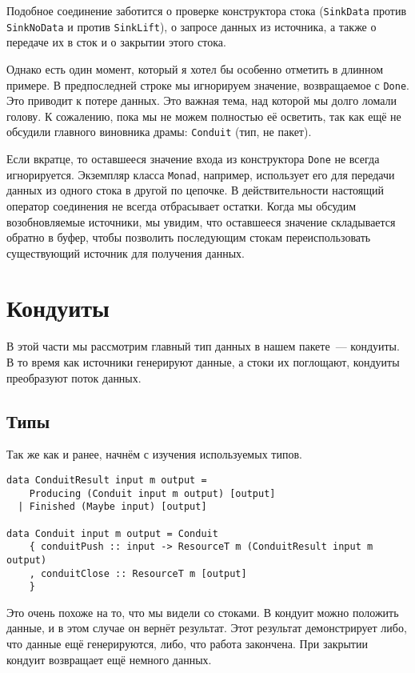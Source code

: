 Подобное соединение заботится о проверке конструктора стока (\lstinline'SinkData' против
\lstinline'SinkNoData' и против \lstinline'SinkLift'), о запросе данных из источника, а также о передаче их
в сток и о закрытии этого стока.

Однако есть один момент, который я хотел бы особенно отметить в длинном примере. В предпоследней строке
мы игнорируем значение, возвращаемое с \lstinline'Done'. Это приводит
к потере данных. Это важная тема, над которой мы долго ломали голову. К сожалению,
пока мы не можем полностью её осветить, так как ещё не обсудили главного виновника
драмы: \lstinline'Conduit' (тип, не пакет).

Если вкратце, то оставшееся значение входа из конструктора \lstinline{Done} не всегда игнорируется. Экземпляр класса \lstinline{Monad},
например, использует его для передачи данных из одного стока в другой по цепочке.
В действительности настоящий оператор соединения не всегда отбрасывает остатки. Когда мы
обсудим возобновляемые источники, мы
увидим, что оставшееся значение складывается обратно в буфер, чтобы позволить последующим
стокам переиспользовать существующий источник для получения данных.

\section{Кондуиты}
В этой части мы рассмотрим главный тип данных в нашем пакете~--- кондуиты. В то время как
источники генерируют данные, а стоки их поглощают, кондуиты преобразуют поток данных.

\subsection{Типы}
Так же как и ранее, начнём с изучения используемых типов.
\begin{lstlisting}
data ConduitResult input m output =
    Producing (Conduit input m output) [output]
  | Finished (Maybe input) [output]

data Conduit input m output = Conduit
    { conduitPush :: input -> ResourceT m (ConduitResult input m output)
    , conduitClose :: ResourceT m [output]
    }
\end{lstlisting}
Это очень похоже на то, что мы видели со стоками. В кондуит можно положить данные, и в этом
случае он вернёт результат. Этот результат демонстрирует либо, что данные ещё
генерируются, либо, что работа закончена. При закрытии кондуит возвращает ещё немного данных.

